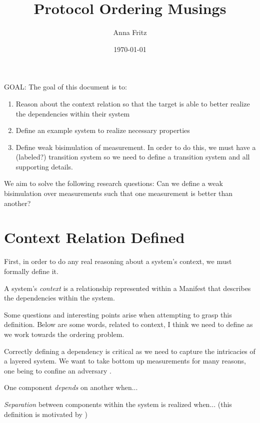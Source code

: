 \documentclass[12pt, letterpaper]{article}
\title{Protocol Ordering Musings}
\author{Anna Fritz}
\date{\today}
\newcommand{\squash}{\itemsep=0pt\parskip=0pt}
\begin{document}
\maketitle

GOAL: The goal of this document is to: 
\begin{enumerate}
  \squash
  \item Reason about the context relation so that the target is able to better realize the dependencies within their system
  \item Define an example system to realize necessary properties
  \item Define weak bisimulation of measurement. In order to do this, we must have a (labeled?) transition system so we need to define a transition system and all supporting details. 
\end{enumerate}

We aim to solve the following research questions: Can we define a weak bisimulation over measurements such that one measurement is better than another? 

\tableofcontents

\pagebreak

\section{Context Relation Defined}

First, in order to do any real reasoning about a system's context, we must formally define it. 

\begin{defn}[Context]
  A system's \emph{context} is a relationship represented within a Manifest that describes the dependencies within the system. 
\end{defn}

Some questions and interesting points arise when attempting to grasp this definition. Below are some words, related to context, I think we need to define as we work towards the ordering problem. 

Correctly defining a dependency is critical as we need to capture the intricacies of a layered system. We want to take bottom up measurements for many reasons, one being to confine an adversary \cite{Rowe::Bundling}.

\begin{defn}[Dependency] 
  One component \emph{depends} on another when... 
\end{defn}

\begin{defn}[Separation] 
  \emph{Separation} between components within the system is realized when... (this definition is motivated by \cite{Ramsdell::Orchestrating} )
\end{defn}
\end{document}
